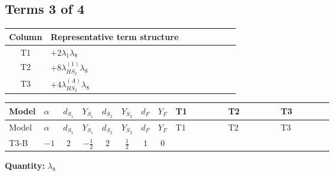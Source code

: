 \documentclass[8pt]{article}
\begin{document}
\begin{landscape}
\subsection*{Terms 3 of 4}
\begin{center}
\begin{tabular}{@{}c >{\raggedright\arraybackslash}p{0.82\linewidth}@{}}
\toprule
Column & Representative term structure \\
\midrule
T1 & \(\displaystyle +2 {\lambda_1} {\lambda_{8}}\) \\
\midrule
T2 & \(\displaystyle +8 {\lambda_{HS_2}^{(1)}} {\lambda_{8}}\) \\
\midrule
T3 & \(\displaystyle +4 {\lambda_{HS_2}^{(A)}} {\lambda_{8}}\) \\
\midrule
\bottomrule
\end{tabular}
\end{center}
\smallskip
\tiny
\begin{longtable}{@{}llcccccc >{\raggedright\arraybackslash}p{0.21\linewidth} >{\raggedright\arraybackslash}p{0.21\linewidth} >{\raggedright\arraybackslash}p{0.21\linewidth}@{}}
\toprule
Model & $\alpha$ & $d_{S_1}$ & $Y_{S_1}$ & $d_{S_2}$ & $Y_{S_2}$ & $d_F$ & $Y_F$ & T1 & T2 & T3 \\
\midrule
\endfirsthead
\toprule
Model & $\alpha$ & $d_{S_1}$ & $Y_{S_1}$ & $d_{S_2}$ & $Y_{S_2}$ & $d_F$ & $Y_F$ & T1 & T2 & T3 \\
\midrule
\endhead
T3-B & $-1$ & $2$ & $-\frac{1}{2}$ & $2$ & $\frac{1}{2}$ & $1$ & $0$ & \scriptsize\adjustbox{max width=\linewidth}{$\begin{gathered} +2 {\lambda_1} {\lambda_{8}}\end{gathered}$} & \scriptsize\adjustbox{max width=\linewidth}{$\begin{gathered} +8 {\lambda_{HS_2}^{(1)}} {\lambda_{8}}\end{gathered}$} & \scriptsize\adjustbox{max width=\linewidth}{$\begin{gathered} +4 {\lambda_{HS_2}^{(A)}} {\lambda_{8}}\end{gathered}$} \\
\midrule
\bottomrule
\end{longtable}
\clearpage
\noindent\textbf{Quantity: }$\lambda_{8}$\par\smallskip

\end{landscape}
\end{document}
